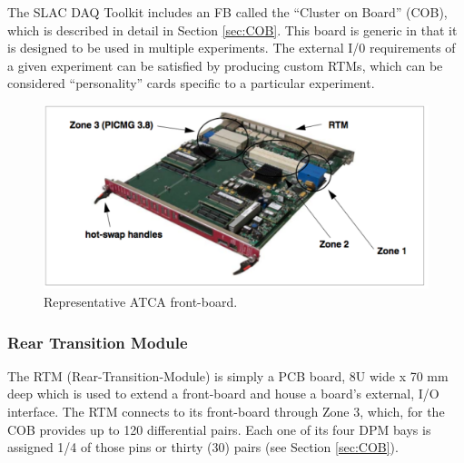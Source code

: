 The SLAC DAQ Toolkit includes an FB called the ``Cluster on Board'' (COB), which is
described in detail in Section \ref{sec:COB}.
This board is generic in that it is designed to be used in multiple experiments.
The external I/0 requirements of a given experiment can be satisfied by producing custom RTMs,
which can be considered ``personality'' cards specific to a particular experiment. 

\begin{figure}[tbh]
\includegraphics[scale=0.8]{front-boardpdf.pdf}
\caption{Representative ATCA front-board.}
\label{fig:frontBoard}
\end{figure} 

\subsubsection{Rear Transition Module}
\label{sec:rtm}
The RTM (Rear-Transition-Module) is simply a PCB board, 
8U wide x 70 mm deep which is used to extend a front-board and  
house a board's external, I/O interface. 
The RTM connects to its front-board through Zone 3, which,
for the COB provides up to 120 differential pairs.
Each one of its four DPM bays 
is assigned 1/4 of those pins or thirty (30) pairs (see Section \ref{sec:COB}).

